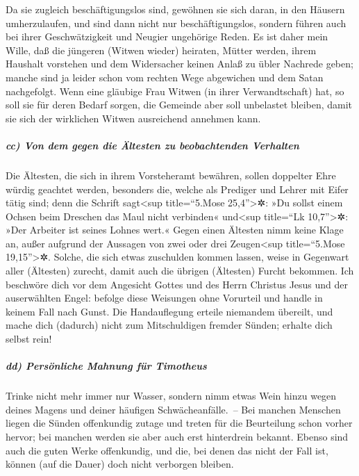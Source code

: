 Da sie zugleich beschäftigungslos sind, gewöhnen sie sich daran, in den
Häusern umherzulaufen, und sind dann nicht nur beschäftigungslos,
sondern führen auch bei ihrer Geschwätzigkeit und Neugier ungehörige
Reden.  Es ist daher mein Wille, daß die jüngeren (Witwen
wieder) heiraten, Mütter werden, ihrem Haushalt vorstehen und dem
Widersacher keinen Anlaß zu übler Nachrede geben;  manche
sind ja leider schon vom rechten Wege abgewichen und dem Satan
nachgefolgt.  Wenn eine gläubige Frau Witwen (in ihrer
Verwandtschaft) hat, so soll sie für deren Bedarf sorgen, die Gemeinde
aber soll unbelastet bleiben, damit sie sich der wirklichen Witwen
ausreichend annehmen kann.

\hypertarget{cc-von-dem-gegen-die-uxe4ltesten-zu-beobachtenden-verhalten}{%
\subparagraph{cc) Von dem gegen die Ältesten zu beobachtenden
Verhalten}\label{cc-von-dem-gegen-die-uxe4ltesten-zu-beobachtenden-verhalten}}

 Die Ältesten, die sich in ihrem Vorsteheramt bewähren,
sollen doppelter Ehre würdig geachtet werden, besonders die, welche als
Prediger und Lehrer mit Eifer tätig sind;  denn die
Schrift sagt\textless sup title=``5.Mose 25,4''\textgreater✲: »Du sollst
einem Ochsen beim Dreschen das Maul nicht verbinden« und\textless sup
title=``Lk 10,7''\textgreater✲: »Der Arbeiter ist seines Lohnes wert.«
 Gegen einen Ältesten nimm keine Klage an, außer aufgrund
der Aussagen von zwei oder drei Zeugen\textless sup title=``5.Mose
19,15''\textgreater✲.  Solche, die sich etwas zuschulden
kommen lassen, weise in Gegenwart aller (Ältesten) zurecht, damit auch
die übrigen (Ältesten) Furcht bekommen.  Ich beschwöre
dich vor dem Angesicht Gottes und des Herrn Christus Jesus und der
auserwählten Engel: befolge diese Weisungen ohne Vorurteil und handle in
keinem Fall nach Gunst.  Die Handauflegung erteile
niemandem übereilt, und mache dich (dadurch) nicht zum Mitschuldigen
fremder Sünden; erhalte dich selbst rein!

\hypertarget{dd-persuxf6nliche-mahnung-fuxfcr-timotheus}{%
\subparagraph{dd) Persönliche Mahnung für
Timotheus}\label{dd-persuxf6nliche-mahnung-fuxfcr-timotheus}}

 Trinke nicht mehr immer nur Wasser, sondern nimm etwas
Wein hinzu wegen deines Magens und deiner häufigen Schwächeanfälle.~--
 Bei manchen Menschen liegen die Sünden offenkundig
zutage und treten für die Beurteilung schon vorher hervor; bei manchen
werden sie aber auch erst hinterdrein bekannt.  Ebenso
sind auch die guten Werke offenkundig, und die, bei denen das nicht der
Fall ist, können (auf die Dauer) doch nicht verborgen bleiben.

